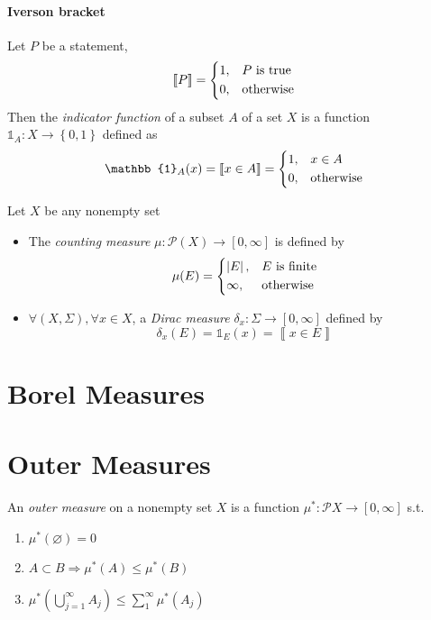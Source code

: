 \paragraph{Iverson bracket}
    Let \(P\) be a statement,
    \[\left \llbracket P \right \rrbracket=\begin{dcases}
        1, & P \mbox{ is true}\\
        0, & \mbox{otherwise}
    \end{dcases}\]
Then the \emph{indicator function} of a subset \(A\) of a set \(X\) is a function \(\mathbb{1}_A : X \to \left\{ 0,1 \right\}\) defined as
\[\mathbb{1}_A(x) = \left \llbracket x \in A \right \rrbracket = \begin{dcases}
    1, & x \in A \\
    0, & \mbox{otherwise}
\end{dcases}\]
\begin{example}
    Let \(X\) be any nonempty set
    \begin{itemize}
        \item The \emph{counting measure} \(\mu : \mathcal{P}(X) \to [0,\infty]\) is defined by
        \[\mu(E)=\begin{dcases}
            \left \lvert E \right \rvert, & E \mbox{ is finite} \\
            \infty, & \mbox{otherwise}
        \end{dcases}\]
        \item \(\forall (X,\Sigma), \forall x \in X\), a \emph{Dirac measure} \(\delta_x: \Sigma \to [0,\infty]\) defined by \[\delta_x(E)=\mathbb{1}_E(x)=\left \llbracket x \in E \right \rrbracket \]
    \end{itemize}
\end{example}

\section{Borel Measures}

\section{Outer Measures}

\begin{definition}
    An \emph{outer measure} on a nonempty set \(X\) is a function \(\mu^\ast: \mathcal{P}X \to [0,\infty]\) s.t.
    \begin{enumerate}
        \item \(\mu^\ast(\varnothing)=0\)
        \item \(A \subset B \Rightarrow \mu^\ast(A) \le \mu^\ast(B)\)
        \item \(\mu^\ast(\bigcup_{j=1}^{\infty} A_j) \le \sum_{1}^{\infty} \mu^\ast(A_j)\)
    \end{enumerate}
\end{definition}


